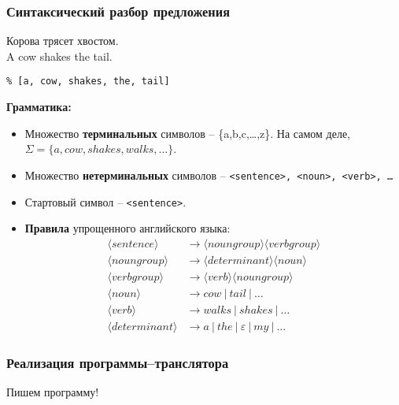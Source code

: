 \documentclass[10pt]{beamer}
\begin{document}
\begin{frame}[fragile]
  \frametitle{Синтаксический разбор предложения}
  Корова трясет хвостом.\\
  A cow shakes the tail.

  \verb|% [a, cow, shakes, the, tail]|

  \textbf{Грамматика:}
  \begin{itemize}
  \item Множество \textbf{терминальных} символов -- \{a,b,c,\ldots,z\}.  На самом деле, $\Sigma=\{a,cow,shakes,walks,\ldots\}$.
  \item Множество \textbf{нетерминальных} символов -- \texttt{<sentence>, <noun>, <verb>, \ldots}
  \item \textnormal{Стартовый} символ -- \texttt{<sentence>}.
  \item \textbf{Правила} упрощенного английского языка:
    \begin{align}
      \label{eq:eng-gramm}
      \langle{}sentence\rangle{} & \to  \langle{}noun group\rangle{} \langle{}verb group\rangle{} \\
      \langle{}noun group\rangle{} & \to  \langle{}determinant\rangle{} \langle{}noun\rangle{} \\
      \langle{}verb group\rangle{} & \to  \langle{}verb\rangle{} \langle{}noun group\rangle{} \\
      \langle{}noun\rangle{} & \to cow\ |\ tail\ |\ \ldots \\
      \langle{}verb\rangle{} & \to walks\ |\ shakes\ |\ \ldots \\
      \langle{}determinant\rangle{} & \to a\ |\ the\ |\ \varepsilon\ |\ my\ |\ \ldots
    \end{align}
  \end{itemize}
\end{frame}

\begin{frame}
  \frametitle{Реализация программы--транслятора}
  \vfil
  \begin{center}
    \Large Пишем программу!
  \end{center}
  \vfil
\end{frame}


\end{document}
